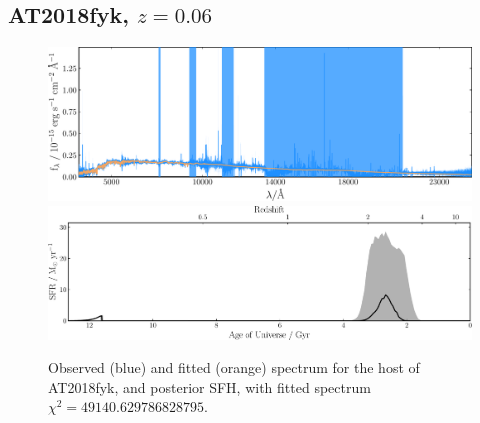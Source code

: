 \documentclass[a4paper,12pt]{article}
\begin{document}


\newpage
\subsection{AT2018fyk, $z=0.06$}\label{sec:AT2018fyk}
\begin{figure}[h!]
  \centering
  \includegraphics[width=\textwidth]{AT2018fyk_spec}
  \includegraphics[width=\textwidth]{AT2018fyk_sfh}
  \caption{
  Observed (blue) and fitted (orange) spectrum for the host of AT2018fyk, and
  posterior SFH, with fitted spectrum $\chi^2=49140.629786828795$.
  }
  \label{fig:AT2018fyk_sfh}
\end{figure}
\end{document}
